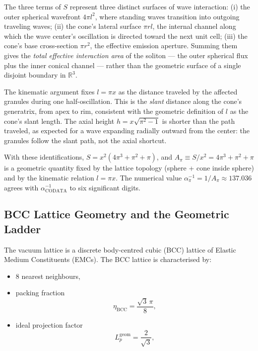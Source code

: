 \documentclass[10pt,a4paper]{article}
\begin{document}
The three terms of $S$ represent three distinct surfaces of wave
interaction: (i) the outer spherical wavefront $4\pi l^2$, where
standing waves transition into outgoing traveling waves; (ii) the
cone's lateral surface $\pi r l$, the internal channel along which
the wave center's oscillation is directed toward the next unit cell;
(iii) the cone's base cross-section $\pi r^2$, the effective
emission aperture. Summing them gives the \emph{total effective
	interaction area} of the soliton — the outer spherical flux plus the
inner conical channel — rather than the geometric surface of a single
disjoint boundary in $\mathbb{R}^3$.

The kinematic argument fixes $l = \pi x$ as the distance traveled by
the affected granules during one half-oscillation. This is the
\emph{slant} distance along the cone's generatrix, from apex to rim,
consistent with the geometric definition of $l$ as the cone's slant
length. The axial height $h = x\sqrt{\pi^2 - 1}$ is shorter than the
path traveled, as expected for a wave expanding radially outward from
the center: the granules follow the slant path, not the axial
shortcut.

With these identifications, $S = x^2(4\pi^3 + \pi^2 + \pi)$, and
$A_\pi \equiv S/x^2 = 4\pi^3 + \pi^2 + \pi$ is a geometric quantity
fixed by the lattice topology (sphere + cone inside sphere) and by
the kinematic relation $l = \pi x$. The numerical value
$\alpha_\pi^{-1} = 1/A_\pi \approx 137.036$ agrees with
$\alpha_{\mathrm{CODATA}}^{-1}$ to six significant digits.

\subsection{BCC Lattice Geometry and the Geometric Ladder}
\label{sec:geom_ladder}

The vacuum lattice is a discrete body-centred cubic (BCC) lattice of Elastic Medium Constituents (EMCs). The BCC lattice is characterised by:
\begin{itemize}
	\item \(8\) nearest neighbours,
	\item packing fraction
	\begin{equation}
		\eta_{\text{BCC}} = \frac{\sqrt{3}\,\pi}{8},
		\label{eq:eta_BCC}
	\end{equation}
	\item ideal projection factor
	\begin{equation}
		L_p^{\text{geom}} = \frac{2}{\sqrt{3}},
		\label{eq:Lp_geom}
	\end{equation}
\end{itemize}
\end{document}

